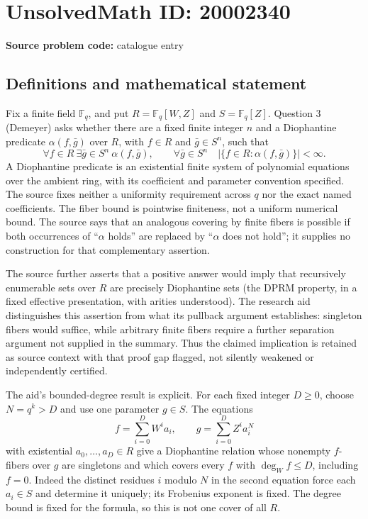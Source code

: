 \documentclass[11pt]{article}
\newcommand{\F}{\mathbb{F}}
\begin{document}
\section*{UnsolvedMath ID: 20002340}
\textbf{Source problem code:} catalogue entry
\subsection{Definitions and mathematical statement}
Fix a finite field $\F_q$, and put $R=\F_q[W,Z]$ and $S=\F_q[Z]$. Question 3 (Demeyer) asks whether there are a fixed finite integer $n$ and a Diophantine predicate $\alpha(f,\bar g)$ over $R$, with $f\in R$ and $\bar g\in S^n$, such that
\[
\forall f\in R\ \exists\bar g\in S^n\ \alpha(f,\bar g),\qquad
\forall\bar g\in S^n\quad |\{f\in R:\alpha(f,\bar g)\}|<\infty.
\]
A Diophantine predicate is an existential finite system of polynomial equations over the ambient ring, with its coefficient and parameter convention specified. The source fixes neither a uniformity requirement across $q$ nor the exact named coefficients. The fiber bound is pointwise finiteness, not a uniform numerical bound. The source says that an analogous covering by finite fibers is possible if both occurrences of ``$\alpha$ holds'' are replaced by ``$\alpha$ does not hold''; it supplies no construction for that complementary assertion.

The source further asserts that a positive answer would imply that recursively enumerable sets over $R$ are precisely Diophantine sets (the DPRM property, in a fixed effective presentation, with arities understood). The research aid distinguishes this assertion from what its pullback argument establishes: singleton fibers would suffice, while arbitrary finite fibers require a further separation argument not supplied in the summary. Thus the claimed implication is retained as source context with that proof gap flagged, not silently weakened or independently certified.

The aid's bounded-degree result is explicit. For each fixed integer $D\geq0$, choose $N=q^k>D$ and use one parameter $g\in S$. The equations
\[
f=\sum_{i=0}^{D}W^i a_i,\qquad
g=\sum_{i=0}^{D}Z^i a_i^{N}
\]
with existential $a_0,\ldots,a_D\in R$ give a Diophantine relation whose nonempty $f$-fibers over $g$ are singletons and which covers every $f$ with $\deg_W f\leq D$, including $f=0$. Indeed the distinct residues $i$ modulo $N$ in the second equation force each $a_i\in S$ and determine it uniquely; its Frobenius exponent is fixed. The degree bound is fixed for the formula, so this is not one cover of all $R$.
\end{document}
